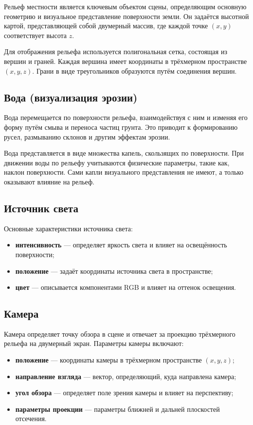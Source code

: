 Рельеф местности является ключевым объектом сцены, определяющим основную геометрию и визуальное представление поверхности земли.
Он задаётся высотной картой, представляющей собой двумерный массив, где каждой точке $(x, y)$ соответствует высота $z$.

Для отображения рельефа используется полигональная сетка, состоящая из вершин и граней.
Каждая вершина имеет координаты в трёхмерном пространстве $(x, y, z)$.
Грани в виде треугольников образуются путём соединения вершин.

\subsection{Вода (визуализация эрозии)}

Вода перемещается по поверхности рельефа, взаимодействуя с ним и изменяя его форму путём смыва и переноса частиц грунта.
Это приводит к формированию русел, размыванию склонов и другим эффектам эрозии.

Вода представляется в виде множества капель, скользящих по поверхности.
При движении воды по рельефу учитываются физические параметры, такие как, наклон поверхности.
Сами капли визуального представления не имеют, а только оказывают влияние на рельеф.

\subsection{Источник света}

Основные характеристики источника света:

\begin{itemize}
    \item \textbf{интенсивность} --- определяет яркость света и влияет на освещённость поверхности;
    \item \textbf{положение} --- задаёт координаты источника света в пространстве;
    \item \textbf{цвет} --- описывается компонентами RGB и влияет на оттенок освещения.
\end{itemize}

\subsection{Камера}

Камера определяет точку обзора в сцене и отвечает за проекцию трёхмерного рельефа на двумерный экран.
Параметры камеры включают:

\begin{itemize}
    \item \textbf{положение} --- координаты камеры в трёхмерном пространстве $(x, y, z)$;
    \item \textbf{направление взгляда} --- вектор, определяющий, куда направлена камера;
    \item \textbf{угол обзора} --- определяет поле зрения камеры и влияет на перспективу;
    \item \textbf{параметры проекции} --- параметры ближней и дальней плоскостей отсечения.
\end{itemize}

